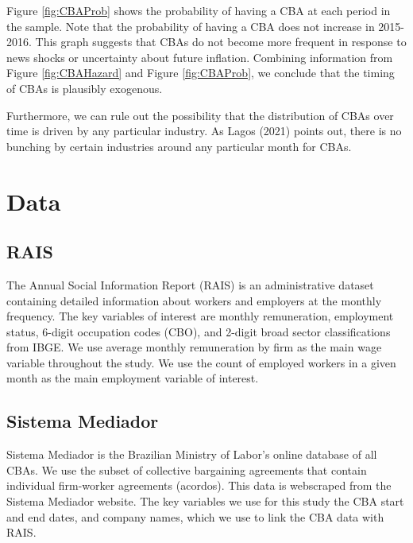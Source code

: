 \documentclass[12pt]{article}
\begin{document}
		Figure \ref{fig:CBAProb} shows the probability of having a CBA at each period in the sample. Note that the probability of having a CBA does not increase in 2015-2016. This graph suggests that CBAs do not become more frequent in response to news shocks or uncertainty about future inflation.
		Combining information from Figure \ref{fig:CBAHazard} and Figure \ref{fig:CBAProb}, we conclude that the timing of CBAs is plausibly exogenous. 

		Furthermore, we can rule out the possibility that the distribution of CBAs over time is driven by any particular industry. As Lagos (2021) points out, there is no bunching by certain industries around any particular month for CBAs.
	\section{Data}
		\subsection{RAIS}
		The Annual Social Information Report (RAIS) is an administrative dataset containing detailed information about workers and employers at the monthly frequency. The key variables of interest are monthly remuneration, employment status, 6-digit occupation codes (CBO), and 2-digit broad sector classifications from IBGE. We use average monthly remuneration by firm as the main wage variable throughout the study. We use the count of employed workers in a given month as the main employment variable of interest. 


		\subsection{Sistema Mediador}
		Sistema Mediador is the Brazilian Ministry of Labor's online database of all CBAs. We use the subset of collective bargaining agreements that contain individual firm-worker agreements (acordos). This data is webscraped from the Sistema Mediador website. The key variables we use for this study the CBA start and end dates, and company names, which we use to link the CBA data with RAIS.
\end{document}
